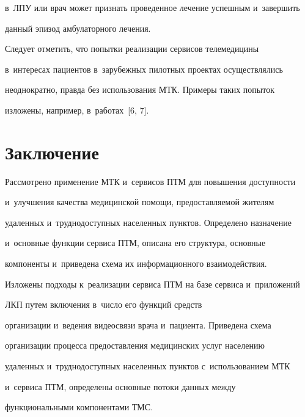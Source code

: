 в~ЛПУ или врач может признать проведенное лечение успешным и~завершить 


данный эпизод амбулаторного лечения.


  


  Следует отметить, что попытки реализации сервисов телемедицины 


в~интересах пациентов в~зарубежных пилотных проектах осуществлялись 


неоднократно, правда без использования МТК. Примеры таких попыток 


изложены, например, в~работах~[6, 7].





\section{Заключение}





  Рассмотрено применение МТК и~сервисов ПТМ для повышения доступности 


и~улучшения качества медицинской помощи, предоставляемой жителям 


удаленных и~труднодоступных населенных пунктов. Определено назначение 


и~основные функции сервиса ПТМ, описана его структура, основные 


компоненты и~приведена схема их информационного взаимодействия. 


Изложены подходы к~реализации сервиса ПТМ на базе сервиса и~приложений 


ЛКП путем включения в~число его функций средств 


организации и~ведения видеосвязи врача и~пациента. Приведена схема 


организации процесса предоставления медицинских услуг населению 


удаленных и~труднодоступных населенных пунктов с~использованием МТК 


и~сервиса ПТМ, определены основные потоки данных между 


функциональными компонентами ТМС.


  


